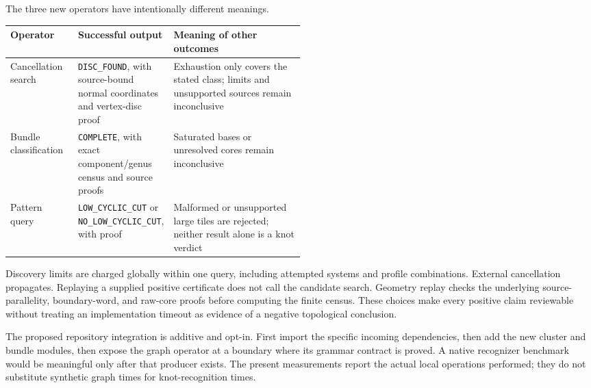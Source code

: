 The three new operators have intentionally different meanings.
\begin{center}\small
\begin{tabularx}{\linewidth}{@{}P{0.23\linewidth}P{0.27\linewidth}Y@{}}
\toprule
Operator & Successful output & Meaning of other outcomes\\
\midrule
Cancellation search & \texttt{DISC\_FOUND}, with source-bound normal
coordinates and vertex-disc proof & Exhaustion only covers the stated class;
limits and unsupported sources remain inconclusive\\
Bundle classification & \texttt{COMPLETE}, with exact component/genus census
and source proofs & Saturated bases or unresolved cores remain inconclusive\\
Pattern query & \texttt{LOW\_CYCLIC\_CUT} or
\texttt{NO\_LOW\_CYCLIC\_CUT}, with proof & Malformed or unsupported
large tiles are rejected; neither result alone is a knot verdict\\
\bottomrule
\end{tabularx}\end{center}

Discovery limits are charged globally within one query, including attempted
systems and profile combinations. External cancellation propagates. Replaying
a supplied positive certificate does not call the candidate search. Geometry
replay checks the underlying source-parallelity, boundary-word, and raw-core
proofs before computing the finite census. These choices make every positive
claim reviewable without treating an implementation timeout as evidence of a
negative topological conclusion.

The proposed repository integration is additive and opt-in. First import the
specific incoming dependencies, then add the new cluster and bundle modules,
then expose the graph operator at a boundary where its grammar contract is
proved. A native recognizer benchmark would be meaningful only after that
producer exists. The present measurements report the actual local operations
performed; they do not substitute synthetic graph times for knot-recognition
times.
